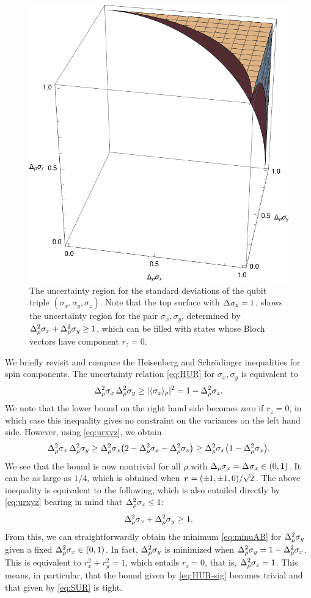 \begin{figure}[ht]\centering
  \includegraphics[width=.5\textwidth]{figs/qubit-triple}
  \caption[The uncertainty region for the standard deviations of the qubit triple $(\sigma_x,\sigma_y,\sigma_z)$]{The uncertainty region for the standard deviations of the qubit triple $(\sigma_x,\sigma_y,\sigma_z)$. Note that the top surface with $\sdev{\sigma_z}=1$, shows the uncertainty region for the pair $\sigma_x,\sigma_y$, determined by
    $\varr{\sigma_x}+\varr{\sigma_y}\ge 1$, which can be filled with states whose Bloch vectors have component $r_z=0$.}
  \label{fig:orth-triple}
\end{figure}



We briefly revisit and compare the Heisenberg and Schr\"odinger inequalities for spin components.
The uncertainty relation \eqref{eq:HUR} for $\sigma_x,\sigma_y$ is equivalent to
\begin{equation}\label{eq:HUR-sig}
  \varr{\sigma_x}\,\varr{\sigma_y}\ge |\langle \sigma_z\rangle_\rho|^2=1-\varr{\sigma_z}.
\end{equation}
We note that the lower bound on the right hand side becomes zero if $r_z=0$, in which case this inequality gives no constraint on the variances on the left hand side. However, using  \eqref{eq:urxyz}, we obtain
\begin{equation}\label{eq:prodbd}
  \varr{\sigma_x}\,\varr{\sigma_y}\ge\varr{\sigma_x}\bigl(2-\varr{\sigma_x}-\varr{\sigma_z}\bigr)\ge\varr{\sigma_x}\bigl(1-\varr{\sigma_x}\bigr).
\end{equation}
We see that the bound is now nontrivial for all $\rho$ with $\sdevr{\sigma_x}=\sdev{\sigma_x}\in(0,1)$. It can be as large as $1/4$, which is obtained when $\bm{r}=(\pm1,\pm1,0)/\sqrt2$. The above inequality is equivalent to the following, which is also entailed directly by \eqref{eq:urxyz} bearing in mind that $\varr{\sigma_z}\le 1$:
\begin{equation}\label{eq:urxy}
  \varr{\sigma_x}+\varr{\sigma_y}\ge 1.
\end{equation}
From this, we can straightforwardly obtain the minimum \eqref{eq:minuAB} for $\varr{\sigma_y}$ given a fixed $\varr{\sigma_x}\in(0,1)$.
In fact, $\varr{\sigma_y}$ is minimized  when $\varr{\sigma_y}=1-\varr{\sigma_x}$. This is equivalent to $r_x^2+r_y^2=1$, which entails $r_z=0$, that is, $\varr{\sigma_z}=1$. This means, in particular, that  the bound given by \eqref{eq:HUR-sig} becomes trivial and that given by \eqref{eq:SUR} is tight.

